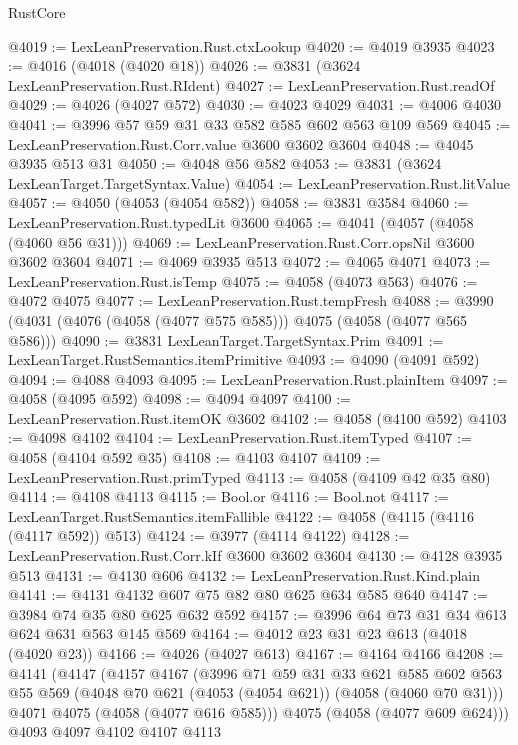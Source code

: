 \begin{lexlean}{RustCore}
\begin{coremodule}
@4019 := LexLeanPreservation.Rust.ctxLookup
@4020 := @4019 @3935
@4023 := @4016 (@4018 (@4020 @18))
@4026 := @3831 (@3624 LexLeanPreservation.Rust.RIdent)
@4027 := LexLeanPreservation.Rust.readOf
@4029 := @4026 (@4027 @572)
@4030 := @4023 @4029
@4031 := @4006 @4030
@4041 := @3996 @57 @59 @31 @33 @582 @585 @602 @563 @109 @569
@4045 := LexLeanPreservation.Rust.Corr.value @3600 @3602 @3604
@4048 := @4045 @3935 @513 @31
@4050 := @4048 @56 @582
@4053 := @3831 (@3624 LexLeanTarget.TargetSyntax.Value)
@4054 := LexLeanPreservation.Rust.litValue
@4057 := @4050 (@4053 (@4054 @582))
@4058 := @3831 @3584
@4060 := LexLeanPreservation.Rust.typedLit @3600
@4065 := @4041 (@4057 (@4058 (@4060 @56 @31)))
@4069 := LexLeanPreservation.Rust.Corr.opsNil @3600 @3602 @3604
@4071 := @4069 @3935 @513
@4072 := @4065 @4071
@4073 := LexLeanPreservation.Rust.isTemp
@4075 := @4058 (@4073 @563)
@4076 := @4072 @4075
@4077 := LexLeanPreservation.Rust.tempFresh
@4088 := @3990 (@4031 (@4076 (@4058 (@4077 @575 @585))) @4075 (@4058 (@4077 @565 @586)))
@4090 := @3831 LexLeanTarget.TargetSyntax.Prim
@4091 := LexLeanTarget.RustSemantics.itemPrimitive
@4093 := @4090 (@4091 @592)
@4094 := @4088 @4093
@4095 := LexLeanPreservation.Rust.plainItem
@4097 := @4058 (@4095 @592)
@4098 := @4094 @4097
@4100 := LexLeanPreservation.Rust.itemOK @3602
@4102 := @4058 (@4100 @592)
@4103 := @4098 @4102
@4104 := LexLeanPreservation.Rust.itemTyped
@4107 := @4058 (@4104 @592 @35)
@4108 := @4103 @4107
@4109 := LexLeanPreservation.Rust.primTyped
@4113 := @4058 (@4109 @42 @35 @80)
@4114 := @4108 @4113
@4115 := Bool.or
@4116 := Bool.not
@4117 := LexLeanTarget.RustSemantics.itemFallible
@4122 := @4058 (@4115 (@4116 (@4117 @592)) @513)
@4124 := @3977 (@4114 @4122)
@4128 := LexLeanPreservation.Rust.Corr.kIf @3600 @3602 @3604
@4130 := @4128 @3935 @513
@4131 := @4130 @606
@4132 := LexLeanPreservation.Rust.Kind.plain
@4141 := @4131 @4132 @607 @75 @82 @80 @625 @634 @585 @640
@4147 := @3984 @74 @35 @80 @625 @632 @592
@4157 := @3996 @64 @73 @31 @34 @613 @624 @631 @563 @145 @569
@4164 := @4012 @23 @31 @23 @613 (@4018 (@4020 @23))
@4166 := @4026 (@4027 @613)
@4167 := @4164 @4166
@4208 := @4141
    (@4147
      (@4157
        @4167
        (@3996
          @71
          @59
          @31
          @33
          @621
          @585
          @602
          @563
          @55
          @569
          (@4048 @70 @621 (@4053 (@4054 @621)) (@4058 (@4060 @70 @31)))
          @4071
          @4075
          (@4058 (@4077 @616 @585)))
        @4075
        (@4058 (@4077 @609 @624)))
      @4093
      @4097
      @4102
      @4107
      @4113

\end{coremodule}
\end{lexlean}

